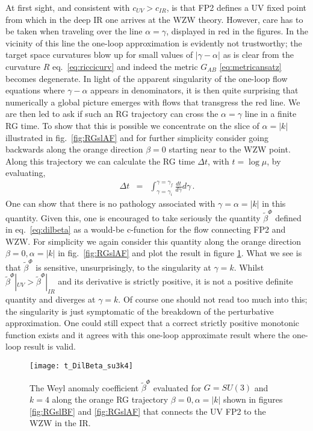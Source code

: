 \documentclass[12pt]{article}
\begin{document}
At first sight, and consistent with $c_{UV} > c_{IR}$, is that FP2  defines a UV fixed point from which in the deep IR one arrives at the WZW theory.   However, care has to be taken when traveling over the line $\alpha=\gamma$, displayed in red in the figures. In the vicinity of this line the one-loop approximation is evidently not trustworthy; the target space curvatures blow up  for small values of $|\gamma-\alpha|$ as is clear from the curvature $R$ eq.~\eqref{eq:riccicurv} and indeed the metric   $G_{AB}$ \eqref{eq:metricansatz} becomes degenerate.   In light of the apparent singularity of the one-loop flow equations where $\gamma-\alpha$ appears in denominators,  it is then quite surprising that numerically a global picture emerges with flows that transgress the red line.  We are then led to ask if such an RG trajectory can cross the $\alpha=\gamma$ line in a finite RG time. To show that this is possible  we concentrate on the slice of $\alpha= |k|$ illustrated in fig.~\ref{fig:RGslAF} and for further simplicity consider going backwards along the orange direction $\beta=0$ starting near to the WZW point.  Along this trajectory we can calculate the RG time $\Delta t$, with $t= \log \mu$, by evaluating,
\begin{eqnarray}
\Delta t &=& \int_{\gamma=\gamma_i}^{\gamma= \gamma_f} \frac{d t }{d\gamma} d\gamma  \, .
\end{eqnarray} 
One can show that there is no pathology associated with $\gamma= \alpha =|k|$ in this quantity.     Given this, one is encouraged to take seriously the quantity $\tilde{\beta}^\Phi$ defined in eq.~\eqref{eq:dilbeta}   as a would-be c-function for the flow connecting FP2 and WZW.  For simplicity we again consider this quantity along the orange direction $\beta=0,\alpha=|k|$   in fig.~\ref{fig:RGslAF} and plot the result in figure  \ref{fig:BetaPhi}.  What we see is that $\tilde{\beta}^\Phi$ is sensitive, unsurprisingly, to the singularity at $\gamma = k$.  Whilst $\tilde{\beta}^\Phi|_{UV}>  \tilde{\beta}^\Phi|_{IR}$ and its derivative is strictly positive, it is not a positive definite quantity and diverges at    $\gamma = k$.  Of course one should not read too much into this; the singularity is just symptomatic of the breakdown of the perturbative approximation.  One could still expect that a correct  strictly positive monotonic function exists and it agrees with this one-loop approximate result where the one-loop result is valid.  
\begin{figure}[H]
\centering
\texttt{[image: t\_DilBeta\_su3k4]}
\caption{The Weyl anomaly coefficient $\tilde{\beta}^\Phi$ evaluated for $G=SU(3)$ and $k=4$ along the orange RG trajectory $\beta=0, \alpha=|k|$ shown in figures \ref{fig:RGslBF} and \ref{fig:RGslAF} that connects the UV FP2 to the WZW in the IR. } \label{fig:BetaPhi}
\end{figure}
\end{document}
